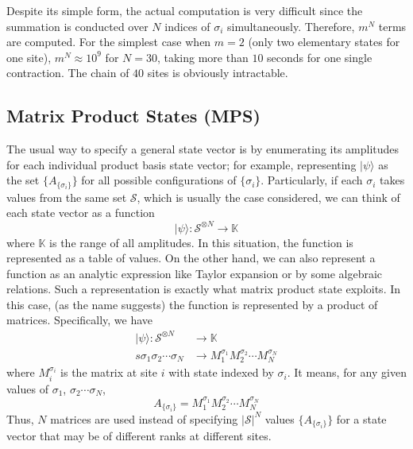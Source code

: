 \documentclass[english]{article}[12pt]
\begin{document}
Despite its simple form, the actual computation is very difficult since
the summation is conducted over $N$ indices of $\sigma_{i}$
simultaneously. Therefore, $m^{N}$ terms are computed. For the simplest case when
$m=2$ (only two elementary states for one site), $m^{N}\approx10^{9}$
for $N=30$, taking more than $10$ seconds for one single contraction.
The chain of $40$ sites is obviously intractable.

\subsection{Matrix Product States (MPS)}

The usual way to specify a general state vector is by enumerating its amplitudes for each individual product basis state vector; for example, representing $|\psi\rangle$ as the set $\{A_{\{\sigma_i\}}\}$ for all possible configurations of $\{\sigma_i\}$. Particularly, if each $\sigma_i$ takes values from the same set $\mathcal{S}$, which is usually the case considered, we can think of each state vector as a function 
\begin{displaymath}
|\psi\rangle: \mathcal{S}^{\otimes N} \rightarrow \mathbb{K}
\end{displaymath}
where $\mathbb{K}$ is the range of all amplitudes. In this situation, the function is represented as a table of values. On the other hand, we can also represent a function as an analytic expression like Taylor expansion or by some algebraic relations. Such a representation is exactly what matrix product state exploits. In this case, (as the name suggests) the function is represented by a product of matrices. Specifically, we have
\begin{displaymath}
\begin{split}
|\psi\rangle: \mathcal{S}^{\otimes N} &\rightarrow \mathbb{K} \\s
\sigma_1\sigma_2\cdots\sigma_N &\rightarrow M_1^{\sigma_1}M_2^{\sigma_2}\cdots M_N^{\sigma_N}
\end{split}
\end{displaymath}
where $M_i^{\sigma_i}$ is the matrix at site $i$ with state indexed by $\sigma_i$. It means, for any given values of $\sigma_1$, $\sigma_2 \cdots \sigma_N$,
\begin{displaymath}
A_{\{\sigma_i\}} = M_1^{\sigma_1}M_2^{\sigma_2}\cdots M_N^{\sigma_N}
\end{displaymath}
Thus, $N$  matrices are used instead of specifying $|\mathcal{S}|^N$ values $\{A_{\{\sigma_i\}}\}$ for a state vector that may be of different ranks at different sites.
\end{document}
